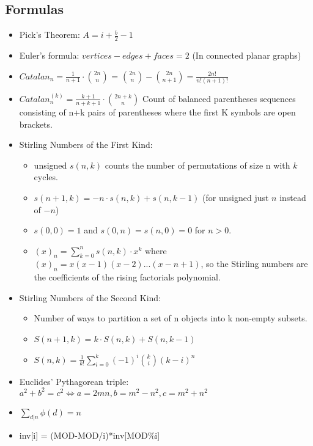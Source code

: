 \documentclass[landscape, 8pt, a4paper, oneside]{extarticle}
\begin{document}
\begin{multicols}{3}
\subsection{Formulas}
 \begin{itemize}
     \item Pick's Theorem: $A = i + \frac{b}{2} - 1$
     \item Euler's formula: $vertices - edges + faces = 2$ (In connected planar graphs)
     \item $Catalan_n = \frac{1}{n+1} \cdot \binom{2n}{n}$ = $\binom{2n}{n} - \binom{2n}{n+1} = \frac{2n!}{n!(n+1)!}$
     \item $Catalan_n^{(k)} = \frac{k+1}{n+k+1} \cdot \binom{2n+k}{n}$ Count of balanced parentheses sequences consisting of n+k
                  pairs of parentheses where the first K
                  symbols are open brackets.
           \item Stirling Numbers of the First Kind:
                \begin{itemize}
                   \item unsigned $s(n, k)$ counts the number of permutations of size n with $k$ cycles.
                   \item $s(n+1, k) = -n \cdot s(n, k) + s(n, k - 1)$ (for unsigned just $n$ instead of $-n$)
                   \item $s(0, 0) = 1$ and $s(0, n) = s(n, 0) = 0$ for $n > 0$.
                   \item $(x)_n = \sum\limits_{k=0}^n{s(n, k)\cdot{x^k}}$ where $(x)_n = x(x-1)(x-2)...(x-n+1)$, so the Stirling numbers are the coefficients of the rising factorials polynomial.
               \end{itemize}
          \item Stirling Numbers of the Second Kind:
                \begin{itemize}
                    \item Number of ways to partition a set of n objects into k non-empty subsets.
                    \item $S(n+1, k) = k\cdot{S(n, k)}+S(n, k-1)$
                    \item $S(n, k) = \frac{1}{k!} \sum\limits_{i=0}^k (-1)^i \binom{k}{i} (k-i)^n$
                \end{itemize}
    \item Euclides' Pythagorean triple: $a^2 + b^2 = c^2 \iff a = 2mn, b = m^2 - n^2, c = m^2 + n^2$
    \item $\sum_{d|n}\phi(d) = n$
    \item inv[i] = (MOD-MOD/i)*inv[MOD\%i]%
    

\end{itemize}
\end{multicols}
\end{document}
